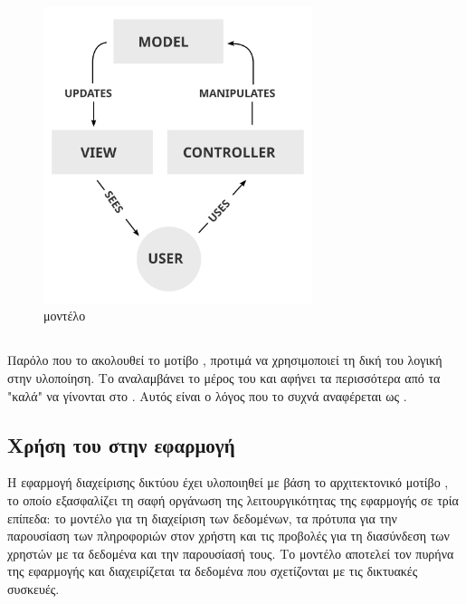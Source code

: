 \begin{figure}[h]
	\centering
	\includegraphics[width=0.7\textwidth]{graphics/MVC-Process.svg.png}
	\caption{ μοντέλο}
\end{figure}

\FloatBarrier

\subsection{ }

Παρόλο που το  ακολουθεί το μοτίβο , προτιμά να χρησιμοποιεί τη δική του λογική στην υλοποίηση. Το  αναλαμβάνει το  
μέρος του  και αφήνει τα περισσότερα από τα "καλά" να γίνονται στο .
Αυτός είναι ο λόγος που το  συχνά αναφέρεται ως .



\subsection{Χρήση του  στην εφαρμογή}

Η εφαρμογή διαχείρισης δικτύου έχει υλοποιηθεί με βάση το 
αρχιτεκτονικό μοτίβο , το οποίο 
εξασφαλίζει τη σαφή οργάνωση της λειτουργικότητας της εφαρμογής σε 
τρία επίπεδα: το μοντέλο για τη διαχείριση των δεδομένων, τα πρότυπα 
για την παρουσίαση των πληροφοριών στον χρήστη και τις προβολές για 
τη διασύνδεση των χρηστών με τα δεδομένα και την παρουσίασή τους.
Το μοντέλο αποτελεί τον πυρήνα της εφαρμογής και διαχειρίζεται τα 
δεδομένα που σχετίζονται με τις δικτυακές συσκευές. 

